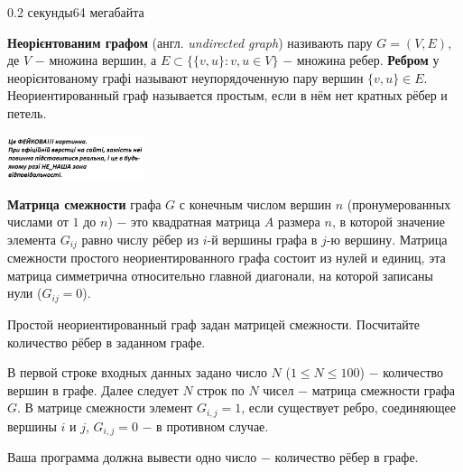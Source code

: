 \begin{problem}{}{}{}{0.2 секунды}{64 мегабайта}

{\bf Неорієнтованим графом} (англ. {\emph{undirected graph}}) називають пару $G=(V,E)$, 
де $V$ $-$ множина вершин, а $E \subset \{\{v,u\}: v,u \in V\}$ $-$ множина ребер.
{\bf Ребром} у неорієнтованому графі называют неупорядоченную пару вершин $\{v,u\} \in E$.
Неориентированный граф называется простым, если в нём нет кратных рёбер и петель.

 \begin{center}
    \includegraphics[width=0.30\textwidth,natwidth=232,natheight=217]{pic.png}
  \end{center}

{\bf Матрица смежности} графа $G$ с конечным числом вершин $n$ (пронумерованных числами от $1$ до $n$) $-$ 
это квадратная матрица $A$ размера $n$, в которой значение элемента $G_{ij}$ равно числу рёбер из $i$-й вершины графа в $j$-ю вершину.
Матрица смежности простого неориентированного графа состоит из нулей и единиц, 
эта матрица симметрична относительно главной диагонали, на которой записаны нули ($G_{ij} = 0$).

Простой неориентированный граф задан матрицей смежности. Посчитайте количество рёбер в заданном графе.

\InputFile
В первой строке входных данных задано число $N$ ($1 \le N \le 100$) $-$ количество вершин в графе.
Далее следует $N$ строк по $N$ чисел $-$ матрица смежности графа $G$. В матрице смежности элемент $G_{i,j}=1$, если
существует ребро, соединяющее вершины $i$ и $j$, $G_{i,j}=0$ $-$ в противном случае.

\OutputFile
Ваша программа должна вывести одно число $-$ количество рёбер в графе.

\Example

\begin{example}
%
\end{example}

\end{problem}

